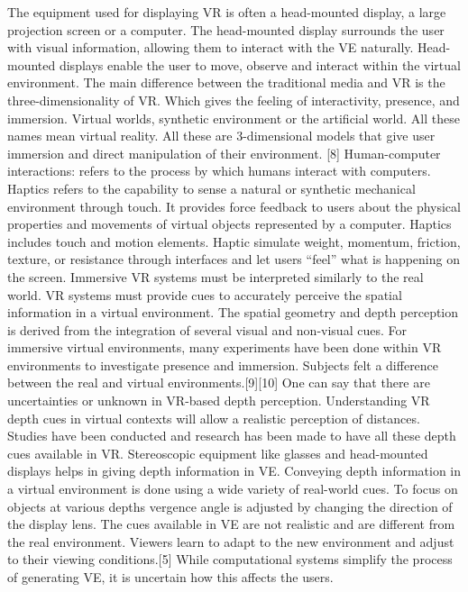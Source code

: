 The equipment used for displaying VR is often a head-mounted display, a large projection screen or a computer. The head-mounted display surrounds the user with visual information, allowing them to interact with the VE naturally. Head-mounted displays enable the user to move, observe and interact within the virtual environment. The main difference between the traditional media and VR is the three-dimensionality of VR. Which gives the feeling of interactivity, presence, and immersion. 
Virtual worlds, synthetic environment or the artificial world. All these names mean virtual reality. All these are 3-dimensional models that give user immersion and direct manipulation of their environment. [8]
Human-computer interactions: refers to the process by which humans interact with computers. 
Haptics refers to the capability to sense a natural or synthetic mechanical environment through touch. It provides force feedback to users about the physical properties and movements of virtual objects represented by a computer. Haptics includes touch and motion elements. Haptic simulate weight, momentum, friction, texture, or resistance through interfaces and let users “feel” what is happening on the screen.
Immersive VR systems must be interpreted similarly to the real world. VR systems must provide cues to accurately perceive the spatial information in a virtual environment.
The spatial geometry and depth perception is derived from the integration of several visual and non-visual cues. For immersive virtual environments, many experiments have been done within VR environments to investigate presence and immersion. Subjects felt a difference between the real and virtual environments.[9][10] One can say that there are uncertainties or unknown in VR-based depth perception. Understanding VR depth cues in virtual contexts will allow a realistic perception of distances. Studies have been conducted and research has been made to have all these depth cues available in VR.   
Stereoscopic equipment like glasses and head-mounted displays helps in giving depth information in VE. 
Conveying depth information in a virtual environment is done using a wide variety of real-world cues. To focus on objects at various depths vergence angle is adjusted by changing the direction of the display lens. The cues available in VE are not realistic and are different from the real environment. Viewers learn to adapt to the new environment and adjust to their viewing conditions.[5] While computational systems simplify the process of generating VE, it is uncertain how this affects the users.


